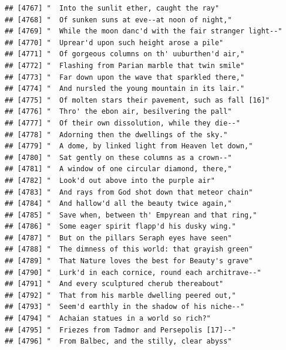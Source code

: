 \documentclass{article}\usepackage[]{graphicx}\usepackage[]{color}
\makeatletter
\newenvironment{kframe}{%
 \def\at@end@of@kframe{}%
 \ifinner\ifhmode%
  \def\at@end@of@kframe{\end{minipage}}%
  \begin{minipage}{\columnwidth}%
 \fi\fi%
 \def\FrameCommand##1{\hskip\@totalleftmargin \hskip-\fboxsep
 \colorbox{shadecolor}{##1}\hskip-\fboxsep
     \hskip-\linewidth \hskip-\@totalleftmargin \hskip\columnwidth}%
 \MakeFramed {\advance\hsize-\width
   \@totalleftmargin\z@ \linewidth\hsize
   \@setminipage}}%
 {\par\unskip\endMakeFramed%
 \at@end@of@kframe}
\newenvironment{knitrout}{}{} %
\makeatother
\begin{document}
\begin{knitrout}
\begin{kframe}
\begin{verbatim}
## [4767] "  Into the sunlit ether, caught the ray"                                     
## [4768] "  Of sunken suns at eve--at noon of night,"                                  
## [4769] "  While the moon danc'd with the fair stranger light--"                      
## [4770] "  Uprear'd upon such height arose a pile"                                    
## [4771] "  Of gorgeous columns on th' uuburthen'd air,"                               
## [4772] "  Flashing from Parian marble that twin smile"                               
## [4773] "  Far down upon the wave that sparkled there,"                               
## [4774] "  And nursled the young mountain in its lair."                               
## [4775] "  Of molten stars their pavement, such as fall [16]"                         
## [4776] "  Thro' the ebon air, besilvering the pall"                                  
## [4777] "  Of their own dissolution, while they die--"                                
## [4778] "  Adorning then the dwellings of the sky."                                   
## [4779] "  A dome, by linked light from Heaven let down,"                             
## [4780] "  Sat gently on these columns as a crown--"                                  
## [4781] "  A window of one circular diamond, there,"                                  
## [4782] "  Look'd out above into the purple air"                                      
## [4783] "  And rays from God shot down that meteor chain"                             
## [4784] "  And hallow'd all the beauty twice again,"                                  
## [4785] "  Save when, between th' Empyrean and that ring,"                            
## [4786] "  Some eager spirit flapp'd his dusky wing."                                 
## [4787] "  But on the pillars Seraph eyes have seen"                                  
## [4788] "  The dimness of this world: that grayish green"                             
## [4789] "  That Nature loves the best for Beauty's grave"                             
## [4790] "  Lurk'd in each cornice, round each architrave--"                           
## [4791] "  And every sculptured cherub thereabout"                                    
## [4792] "  That from his marble dwelling peered out,"                                 
## [4793] "  Seem'd earthly in the shadow of his niche--"                               
## [4794] "  Achaian statues in a world so rich?"                                       
## [4795] "  Friezes from Tadmor and Persepolis [17]--"                                 
## [4796] "  From Balbec, and the stilly, clear abyss"                                  

\end{verbatim}
\end{kframe}
\end{knitrout}
\end{document}
